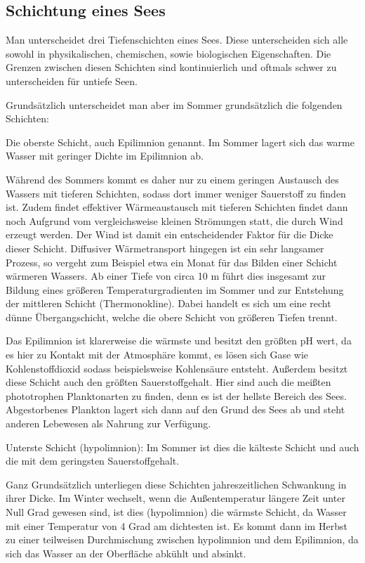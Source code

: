 \documentclass[12pt,a4paper,titlepage,headinclude,bibtotoc]{scrartcl}
\begin{document}
\subsection{Schichtung eines Sees}

Man unterscheidet drei Tiefenschichten eines Sees.
Diese unterscheiden sich alle sowohl in physikalischen, chemischen, sowie biologischen Eigenschaften. Die Grenzen zwischen diesen Schichten sind kontinuierlich und oftmals schwer zu unterscheiden für untiefe Seen.

Grundsätzlich unterscheidet man aber im Sommer grundsätzlich die folgenden Schichten:

Die oberste Schicht, auch Epilimnion genannt. 
Im Sommer lagert sich das warme Wasser mit geringer Dichte im Epilimnion ab.

Während des Sommers kommt es daher nur zu einem geringen Austausch des Wassers
mit tieferen Schichten, sodass dort immer weniger Sauerstoff zu finden ist.
Zudem findet effektiver Wärmeaustausch mit tieferen Schichten findet dann noch Aufgrund vom vergleichsweise
kleinen Strömungen statt, die durch Wind erzeugt werden. 
Der Wind ist damit ein entscheidender Faktor für die Dicke dieser Schicht.
Diffusiver Wärmetransport hingegen ist ein sehr langsamer
Prozess, so vergeht zum Beispiel etwa ein Monat für das Bilden einer Schicht wärmeren Wassers.
Ab einer Tiefe von circa 10 m führt dies insgesamt zur Bildung eines größeren Temperaturgradienten im Sommer und 
zur Entstehung der mittleren Schicht (Thermonokline). Dabei handelt es sich um eine recht dünne  Übergangschicht, welche die obere Schicht von größeren Tiefen trennt. 


Das Epilimnion  ist klarerweise die wärmste und besitzt den größten pH wert, da es hier zu Kontakt mit der Atmosphäre kommt, es lösen sich Gase wie Kohlenstoffdioxid sodass beispielsweise Kohlensäure entsteht. Außerdem besitzt diese Schicht auch den größten Sauerstoffgehalt. Hier sind auch die meißten phototrophen Planktonarten zu finden, denn es ist der hellste Bereich des Sees. Abgestorbenes Plankton lagert sich dann auf den Grund des Sees ab und steht anderen Lebewesen als Nahrung zur Verfügung.

Unterste Schicht (hypolimnion):
Im Sommer ist dies die kälteste Schicht und auch die mit dem geringsten Sauerstoffgehalt. 



Ganz Grundsätzlich unterliegen diese Schichten jahreszeitlichen Schwankung in ihrer Dicke.
Im Winter wechselt, wenn die Außentemperatur längere Zeit unter Null Grad gewesen sind, ist dies (hypolimnion) die wärmste Schicht, da Wasser mit einer Temperatur von 4 Grad am dichtesten ist. 
Es kommt dann im Herbst zu einer teilweisen Durchmischung zwischen hypolimnion und dem Epilimnion, da sich das Wasser an der Oberfläche abkühlt und absinkt.
\end{document}
